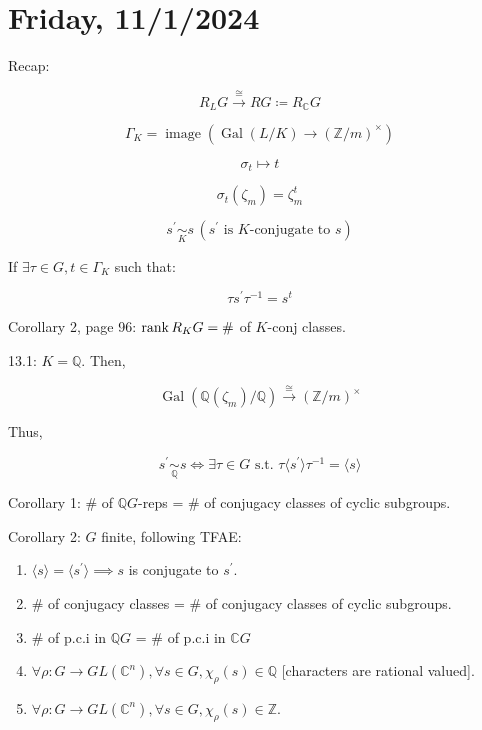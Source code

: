 \documentclass{article}
\theoremstyle{definition}
\begin{document}
\section*{Friday, 11/1/2024}

Recap:

\begin{center}
\end{center}

\[
    R_L G \overset{\cong}{\to} RG \coloneqq R_\mathbb{C} G
\]

\[
    \Gamma_K = \operatorname{image} \left( \operatorname{Gal}(L / K) \to (\mathbb{Z} / m)^\times \right) 
\]

\[
    \sigma_t \mapsto t
\]

\[
    \sigma_t(\zeta_m) = \zeta_m^t
\]

\[
    s^{\prime} \underset{K}{\sim} s \, (s^{\prime} \text{ is } K \text{-conjugate to } s)
\]

If \(\exists \tau \in G, t \in \Gamma_K\) such that:

\[
    \tau s^{\prime} \tau ^{-1} = s^t
\]

Corollary 2, page 96: \(\rank R_K G = \#\) of \(K\)-conj classes.

13.1: \(K = \mathbb{Q}\). Then,

\[
    \operatorname{Gal}(\mathbb{Q}(\zeta_m) / \mathbb{Q}) \overset{\cong}{\to} (\mathbb{Z} / m)^\times
\]

Thus,

\[
    s^{\prime} \underset{\mathbb{Q}}{\sim} s \iff \exists \tau \in G \text{ s.t. } \tau \langle s^{\prime} \rangle \tau ^{-1} = \langle s \rangle 
\]

Corollary 1: \# of \(\mathbb{Q} G\)-reps = \# of conjugacy classes of cyclic subgroups.

Corollary 2: \(G\) finite, following TFAE:

\begin{enumerate}[label=\roman*)]
    \item \(\langle s \rangle = \langle s^{\prime} \rangle \implies s\) is conjugate to \(s^{\prime}\).
    \item \# of conjugacy classes = \# of conjugacy classes of cyclic subgroups.
    \item \# of p.c.i in \(\mathbb{Q} G\) = \# of p.c.i in \(\mathbb{C} G\)
    \item \(\forall \rho: G \to GL(\mathbb{C}^n), \forall s\in G, \chi_{\rho} (s) \in \mathbb{Q}\) [characters are rational valued].
    \item \(\forall \rho : G \to GL(\mathbb{C}^n), \forall s\in G, \chi_{\rho}(s) \in \mathbb{Z}\).
\end{enumerate} 
\end{document}
